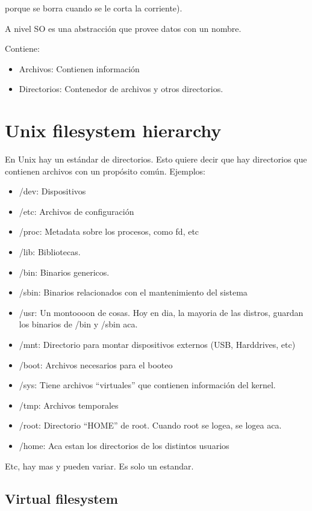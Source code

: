 \documentclass{article}
\begin{document}
porque se borra cuando se le corta la corriente).

A nivel SO es una abstracción que provee datos con un nombre.

Contiene:

\begin{itemize}
\item
  Archivos: Contienen información
\item
  Directorios: Contenedor de archivos y otros directorios.
\end{itemize}

\section{Unix filesystem hierarchy}

En Unix hay un estándar de directorios. Esto quiere decir que hay
directorios que contienen archivos con un propósito común. Ejemplos:

\begin{itemize}
\item
  /dev: Dispositivos
\item
  /etc: Archivos de configuración
\item
  /proc: Metadata sobre los procesos, como fd, etc
\item
  /lib: Bibliotecas.
\item
  /bin: Binarios genericos.
\item
  /sbin: Binarios relacionados con el mantenimiento del sistema
\item
  /usr: Un montoooon de cosas. Hoy en dia, la mayoria de las distros, guardan los binarios de /bin y /sbin aca.
\item
  /mnt: Directorio para montar dispositivos externos (USB, Harddrives, etc) 
\item
  /boot: Archivos necesarios para el booteo
\item
  /sys: Tiene archivos ``virtuales'' que contienen información del kernel.
\item
  /tmp: Archivos temporales
\item
  /root: Directorio ``HOME'' de root. Cuando root se logea, se logea aca.
\item
  /home: Aca estan los directorios de los distintos usuarios
\end{itemize}

Etc, hay mas y pueden variar. Es solo un estandar.

\subsection{Virtual filesystem}\label{virtual-filesystem}
\end{document}
